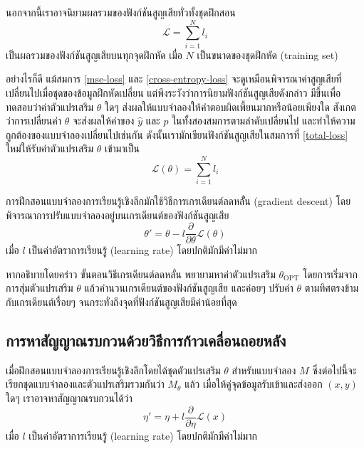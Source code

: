 \documentclass{cpepaper}
\begin{document}
นอกจากนี้เราอาจนิยามผลรวมของฟังก์ชันสูญเสียทั่วทั้งชุดฝึกสอน
\begin{equation}
    \mathcal{L} = \sum_{i=1}^{N}{l_i}
    \label{total-loss}
\end{equation}
เป็นผลรวมของฟังก์ชันสูญเสียบนทุกจุดฝึกหัด เมื่อ $N$ เป็นขนาดของชุดฝึกหัด (training set)

อย่างไรก็ดี แม้สมการ \ref{mse-loss} และ \ref{cross-entropy-loss} จะดูเหมือนพิจารณาค่าสูญเสียที่เปลี่ยนไปเมื่อชุดของข้อมูลฝึกหัดเปลี่ยน แต่พึงระวังว่าการนิยามฟังก์ชันสูญเสียดังกล่าว มีขึ้นเพื่อทดสอบว่าค่าตัวแปรเสริม $\theta$ ใดๆ ส่งผลให้แบบจำลองให้คำตอบผิดเพี้ยนมากหรือน้อยเพียงใด สังเกตว่าการเปลี่ยนค่า $\theta$ จะส่งผลให้ค่าของ $\hat{y}$ และ $p$ ในทั้งสองสมการตามลำดับเปลี่ยนไป และทำให้ความถูกต้องของแบบจำลองเปลี่ยนไปเช่นกัน ดังนั้นเรามักเขียนฟังก์ชันสูญเสียในสมการที่ \ref{total-loss} ใหม่ให้รับค่าตัวแปรเสริม $\theta$ เข้ามาเป็น
\begin{equation}
    \mathcal{L}(\theta) = \sum_{i=1}^{N}{l_i}
    \label{total-loss-theta}
\end{equation}

การฝึกสอนแบบจำลองการเรียนรู้เชิงลึกมักใช้วิธีการเกรเดียนต์ลดหลัั่น (gradient descent) โดยพิจารณาการปรับแบบจำลองอยู่บนเกรเดียนต์ของฟังก์ชันสูญเสีย
\begin{equation}
    \theta' = \theta - l \frac{\partial}{\partial \theta}{\mathcal{L}(\theta)}
    \label{gradient-descent}
\end{equation}
เมื่อ $l$ เป็นค่าอัตราการเรียนรู้ (learning rate) โดยปกติมักมีค่าไม่มาก

หากอธิบายโดยคร่าว ขั้นตอนวิธีเกรเดียนต์ลดหลั่น พยายามหาค่าตัวแปรเสริม $\theta_{\textrm{OPT}}$ โดยการเริ่มจากการสุ่มตัวแปรเสริม $\theta$ แล้วคำนวนเกรเดียนต์ของฟังก์ชันสูญเสีย และค่อยๆ ปรับค่า $\theta$ ตามทิศตรงข้ามกับเกรเดียนต์เรื่อยๆ จนกระทั่งถึงจุดที่ฟังก์ชันสูญเสียมีค่าน้อยที่สุด

\subsection{การหาสัญญาณรบกวนด้วยวิธีการก้าวเคลื่อนถอยหลัง}

เมื่อฝึกสอนแบบจำลองการเรียนรู้เชิงลึกโดยได้ชุดตัวแปรเสริม $\theta$ สำหรับแบบจำลอง $M$ ซึ่งต่อไปนี้จะเรียกชุดแบบจำลองและตัวแปรเสริมรวมกันว่า $M_\theta$ แล้ว เมื่อให้คู่จุดข้อมูลรับเข้าและส่งออก $(x, y)$ ใดๆ เราอาจหาสัญญาณรบกวนได้ว่า
\begin{equation}
    \eta' = \eta + l \frac{\partial}{\partial \eta} \mathcal{L}\left( x \right)
    \label{adver-gradient-descent}
\end{equation}
เมื่อ $l$ เป็นค่าอัตราการเรียนรู้ (learning rate) โดยปกติมักมีค่าไม่มาก
\end{document}
